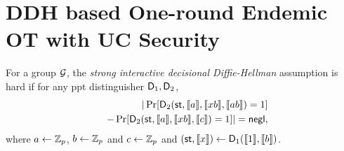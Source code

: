 


\section{DDH based One-round Endemic OT with UC Security }\label{sec:ddhProof}

\begin{definition}\label{def:SIDDH}
	For a group $\mathcal{G}$, the \emph{strong interactive decisional Diffie-Hellman} assumption is hard if for any ppt distinguisher $\mathsf D_1,\mathsf D_2$,
	\begin{eqnarray*}
		&&|\Pr[ \mathsf D_2(\mathsf{st},\llbracket a\rrbracket,\llbracket xb\rrbracket,\llbracket ab\rrbracket)=1]\\
		&&-\Pr[ \mathsf D_2(\mathsf{st},\llbracket a\rrbracket,\llbracket xb\rrbracket,\llbracket c\rrbracket)=1]|=\mathsf{negl},
	\end{eqnarray*}
	where $a\leftarrow\mathbb Z_p$, $b\leftarrow\mathbb Z_p$ and $c\leftarrow\mathbb Z_p$ and $(\mathsf{st},\llbracket x\rrbracket)\leftarrow\mathsf D_1(\llbracket 1\rrbracket,\llbracket b\rrbracket)$.
\end{definition}

